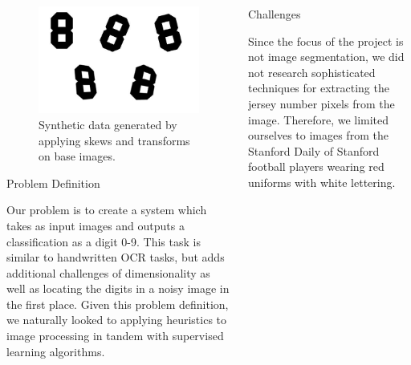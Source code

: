 \documentclass[final]{beamer}
\newlength{\onecolwid}
\newlength{\twocolwid}
\begin{document}
\begin{frame}[t]
\begin{columns}[t]
\begin{column}{\twocolwid}
\begin{columns}[t,totalwidth=\twocolwid]
\begin{column}{\onecolwid}
\begin{figure}
\includegraphics[width=0.8\linewidth]{generated.jpg}
\caption{Synthetic data generated by applying skews and transforms on base images.}
\end{figure}

\begin{block}{Problem Definition}

Our problem is to create a system which takes as input images and outputs a classification as a digit 0-9. This task is similar to handwritten OCR tasks, but adds additional challenges of dimensionality as well as locating the digits in a noisy image in the first place. Given this problem definition, we naturally looked to applying heuristics to image processing in tandem with supervised learning algorithms.

\end{block}


\end{column} %

\begin{column}{\onecolwid}\vspace{-.6in} %


\begin{block}{Challenges}

Since the focus of the project is not image segmentation, we did not research sophisticated techniques for extracting the jersey number pixels from the image. Therefore, we limited ourselves to images from the Stanford Daily of Stanford football players wearing red uniforms with white lettering. 


\end{block}
\end{column}
\end{columns}
\end{column}
\end{columns}
\end{frame}
\end{document}
